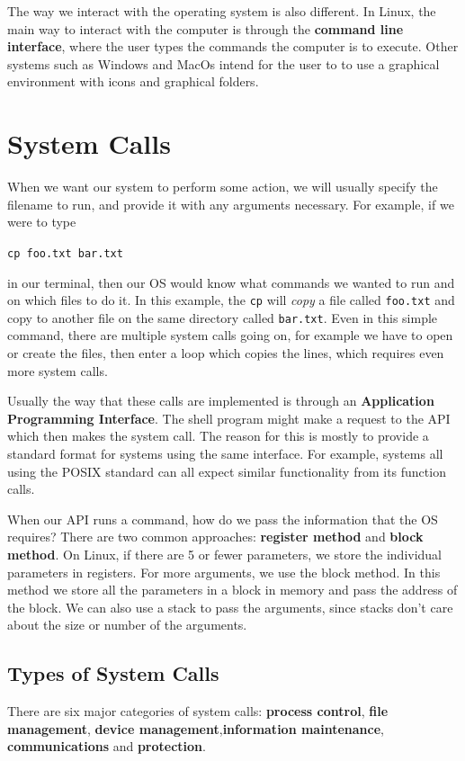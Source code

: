 \documentclass{tufte-handout}
\begin{document}
The way we interact with the operating system is also different. In Linux, the main 
way to interact with the computer is through the \textbf{command line interface}, 
where the user types the commands the computer is to execute. Other systems such as
Windows and MacOs intend for the user to to use a graphical environment with icons 
and graphical folders.

\section{System Calls}
When we want our system to perform some action, we will usually specify the filename
to run, and provide it with any arguments necessary. For example, if we were to type

\begin{center}
		\texttt{cp foo.txt bar.txt}
\end{center}
in our terminal, then our OS would know what commands we wanted to run and on which
files to do it. In this example, the \texttt{cp} will \textit{copy} a file 
called \texttt{foo.txt} and copy to another file on the same directory called 
\texttt{bar.txt}.
Even in this simple command, there are multiple system calls going on,
for example we have to open or create the files, then enter a loop which copies the 
lines, which requires even more system calls.

Usually the way that these calls are implemented is through an 
\textbf{Application Programming Interface}. The shell program might make a request to 
the API which then makes the system call. The reason for this is mostly to provide a 
standard format for systems using the same interface. For example, systems all using
the POSIX standard can all expect similar functionality from its function calls.

When our API runs a command, how do we pass the information that the OS requires?
There are two common approaches: \textbf{register method} and \textbf{block method}.
On Linux, if there are 5 or fewer parameters, we store the individual parameters in 
registers. For more arguments, we use the block method. In this method we store all the
parameters in a block in memory and pass the address of the block. We can also use 
a stack to pass the arguments, since stacks don't care about the size or number
of the arguments.

\subsection{Types of System Calls}
There are six major categories of system calls: \textbf{process control}, 
\textbf{file management}, \textbf{device management},\textbf{information maintenance},
\textbf{communications} and \textbf{protection}.
\end{document}
